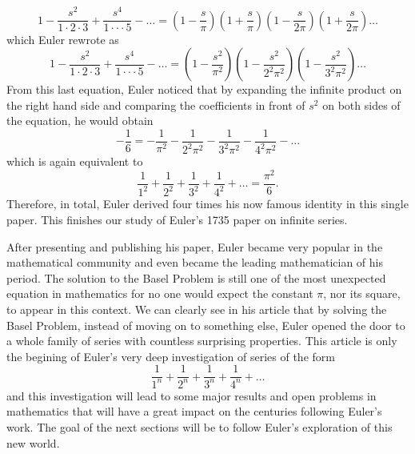 $$1 - \frac{s^2}{1\cdot 2 \cdot 3} + \frac{s^4}{1\cdot \cdot \cdot 5} - \dots = \left(1 - \frac{s}{\pi}\right)\left(1 + \frac{s}{\pi}\right)\left(1 - \frac{s}{2\pi}\right)\left(1 + \frac{s}{2\pi}\right)\dots$$
which Euler rewrote as
\begin{equation}
    1 - \frac{s^2}{1\cdot 2 \cdot 3} + \frac{s^4}{1\cdot \cdot \cdot 5} - \dots = \left(1 - \frac{s^2}{\pi^2}\right)\left(1 - \frac{s^2}{2^2\pi^2}\right)\left(1 - \frac{s^2}{3^2\pi^2}\right)\dots
\end{equation}
From this last equation, Euler noticed that by expanding the infinite product on the right hand side and comparing the coefficients in front of $s^2$ on both sides of the equation, he would obtain
$$-\frac{1}{6} = -\frac{1}{\pi^2}-\frac{1}{2^2\pi^2}-\frac{1}{3^2\pi^2}-\frac{1}{4^2\pi^2}-\dots$$
which is again equivalent to
$$\frac{1}{1^2} + \frac{1}{2^2} + \frac{1}{3^2} + \frac{1}{4^2} + \dots = \frac{\pi^2}{6}.$$
Therefore, in total, Euler derived four times his now famous identity in this single paper. This finishes our study of Euler's 1735 paper on infinite series. 

After presenting and publishing his paper, Euler became very popular in the mathematical community and even became the leading mathematician of his period. The solution to the Basel Problem is still one of the most unexpected equation in mathematics for no one would expect the constant $\pi$, nor its square, to appear in this context. We can clearly see in his article that by solving the Basel Problem, instead of moving on to something else, Euler opened the door to a whole family of series with countless surprising properties. This article is only the begining of Euler's very deep investigation of series of the form
$$\frac{1}{1^n} + \frac{1}{2^n} + \frac{1}{3^n} + \frac{1}{4^n} + \dots$$
and this investigation will lead to some major results and open problems in mathematics that will have a great impact on the centuries following Euler's work. The goal of the next sections will be to follow Euler's exploration of this new world. 